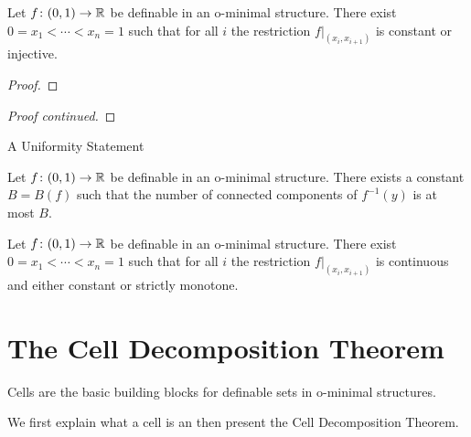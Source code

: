 \documentclass{beamer}
\begin{document}
\begin{frame}
  \begin{lemma}
    Let $f\colon (0,1)\rightarrow{\mathbb{R}}$ be definable in an o-minimal
    structure. There exist $0=x_1<\cdots <x_n =1$
    such that for all $i$ the restriction  $f|_{(x_i,x_{i+1})}$
    is constant or injective. 
  \end{lemma}
  \begin{proof}\renewcommand{\qedsymbol}{}
    \vspace{4.5cm}
  \end{proof}
\end{frame}

\begin{frame}
  \begin{proof}[Proof continued]
    \vspace{7cm}
  \end{proof}
\end{frame}

\begin{frame}{A Uniformity Statement}
  \begin{corollary}
    Let  $f\colon (0,1)\rightarrow
    {\mathbb{R}}$ be definable in an o-minimal structure.
    There exists a constant $B=B(f)$ such that the number of connected
    components of $f^{-1}(y)$ is at most $B$. 
  \end{corollary}

  \begin{theorem}
    Let $f\colon (0,1)\rightarrow{\mathbb{R}}$ be definable in an o-minimal
    structure. There exist $0=x_1<\cdots <x_n =1$
    such that for all $i$ the restriction  $f|_{(x_i,x_{i+1})}$
    is continuous and either constant or strictly monotone.
  \end{theorem}
\end{frame}

\section{The Cell Decomposition Theorem}

\begin{frame}
  Cells are the basic building blocks for definable sets in o-minimal
  structures.

  We first explain what a cell is an then present the Cell
  Decomposition Theorem.
\end{frame}
\end{document}
